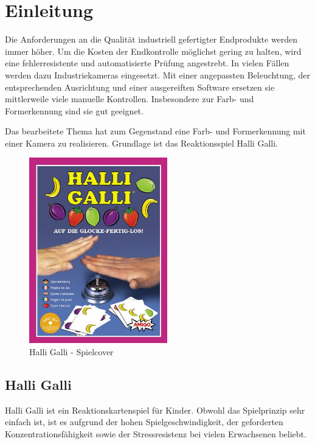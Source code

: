 
\section{Einleitung}
\label{sec:Einleitung}

Die Anforderungen an die Qualität industriell gefertigter Endprodukte werden immer höher. Um die Kosten der Endkontrolle möglichst gering zu halten, wird eine fehlerresistente und automatisierte Prüfung angestrebt. In vielen Fällen werden dazu Industriekameras eingesetzt. Mit einer angepassten Beleuchtung, der entsprechenden Ausrichtung und einer ausgereiften Software ersetzen sie mittlerweile viele manuelle Kontrollen. Insbesondere zur Farb- und Formerkennung sind sie gut geeignet.

Das bearbeitete Thema hat zum Gegenstand eine Farb- und Formerkennung mit einer Kamera zu realisieren. Grundlage ist das Reaktionsspiel Halli Galli. 

\begin{figure}[H]
    \centering
    \includegraphics[width=6cm]{Abbildungen/cover}
    \caption[Cocer]{Halli Galli - Spielcover}
    \label{fig:Cover}
\end{figure}

\subsection{Halli Galli}

Halli Galli ist ein Reaktionskartenspiel für Kinder. Obwohl das Spielprinzip sehr einfach ist, ist es aufgrund der hohen Spielgeschwindigkeit, der geforderten Konzentrationsfähigkeit sowie der Stressresistenz bei vielen Erwachsenen beliebt. 

